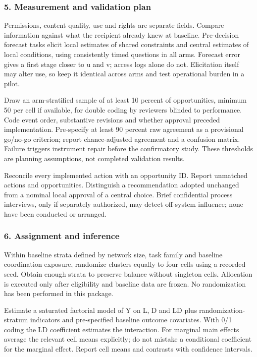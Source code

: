 \documentclass[
  11pt,
]{article}
\begin{document}
\subsubsection{5. Measurement and validation
plan}\label{measurement-and-validation-plan}

Permissions, content quality, use and rights are separate fields.
Compare information against what the recipient already knew at baseline.
Pre-decision forecast tasks elicit local estimates of shared constraints
and central estimates of local conditions, using consistently timed
questions in all arms. Forecast error gives a first stage closer to u
and v; access logs alone do not. Elicitation itself may alter use, so
keep it identical across arms and test operational burden in a pilot.

Draw an arm-stratified sample of at least 10 percent of opportunities,
minimum 50 per cell if available, for double coding by reviewers blinded
to performance. Code event order, substantive revisions and whether
approval preceded implementation. Pre-specify at least 90 percent raw
agreement as a provisional go/no-go criterion; report chance-adjusted
agreement and a confusion matrix. Failure triggers instrument repair
before the confirmatory study. These thresholds are planning
assumptions, not completed validation results.

Reconcile every implemented action with an opportunity ID. Report
unmatched actions and opportunities. Distinguish a recommendation
adopted unchanged from a nominal local approval of a central choice.
Brief confidential process interviews, only if separately authorized,
may detect off-system influence; none have been conducted or arranged.

\subsubsection{6. Assignment and
inference}\label{assignment-and-inference}

Within baseline strata defined by network size, task family and baseline
coordination exposure, randomize clusters equally to four cells using a
recorded seed. Obtain enough strata to preserve balance without
singleton cells. Allocation is executed only after eligibility and
baseline data are frozen. No randomization has been performed in this
package.

Estimate a saturated factorial model of Y on L, D and LD plus
randomization-stratum indicators and pre-specified baseline outcome
covariates. With 0/1 coding the LD coefficient estimates the
interaction. For marginal main effects average the relevant cell means
explicitly; do not mistake a conditional coefficient for the marginal
effect. Report cell means and contrasts with confidence intervals.
\end{document}
